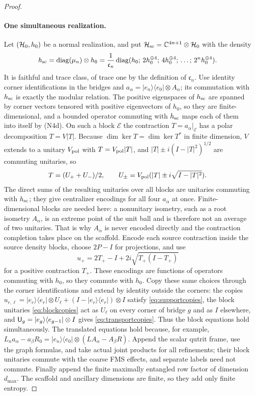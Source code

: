 \begin{proof}
\paragraph{One simultaneous realization.}
Let $(\mathcal H_0,h_0)$ be a normal realization, and put $\mathcal H_{\rm sc}=\mathbb C^{4n+1}\otimes\mathcal H_0$ with the density
\begin{equation}\label{eq:scaffold}
 h_{\rm sc}=\operatorname{diag}(\mu_n)\otimes h_0
 =\frac1{\mathfrak c_n}\operatorname{diag}
 (h_0;\,2h_0^{\oplus4};\,4h_0^{\oplus4};\,\ldots;\,2^nh_0^{\oplus4}).
\end{equation}
It is faithful and trace class, of trace one by the definition of $\mathfrak c_n$. Use identity corner identifications in the bridges and $a_\alpha=|e_n\rangle\langle e_0|\otimes A_\alpha$; its commutation with $h_{\rm sc}$ is exactly the modular relation. The positive eigenspaces of $h_{\rm sc}$ are spanned by corner vectors tensored with positive eigenvectors of $h_0$, so they are finite-dimensional, and a bounded operator commuting with $h_{\rm sc}$ maps each of them into itself by (N4d). On such a block $\mathcal E$ the contraction $T=a_\alpha|_{\mathcal E}$ has a polar decomposition $T=V|T|$. Because $\dim\ker T=\dim\ker T^*$ in finite dimension, $V$ extends to a unitary $V_{\rm pol}$ with $T=V_{\rm pol}|T|$, and $|T|\pm i(I-|T|^2)^{1/2}$ are commuting unitaries, so
\[
 T=(U_++U_-)/2,\qquad
 U_\pm=V_{\rm pol}(|T|\pm i\sqrt{I-|T|^2}).
\]
The direct sums of the resulting unitaries over all blocks are unitaries commuting with $h_{\rm sc}$; they give centralizer encodings for all four $a_\alpha$ at once. Finite-dimensional blocks are needed here: a nonunitary isometry, such as a root isometry $A_\alpha$, is an extreme point of the unit ball and is therefore not an average of two unitaries. That is why $A_\alpha$ is never encoded directly and the contraction completion takes place on the scaffold. Encode each source contraction inside the source density blocks, choose $2P-I$ for projections, and use
\[
 u_+=2T_+-I+2i\sqrt{T_+(I-T_+)}
\]
for a positive contraction $T_+$. These encodings are functions of operators commuting with $h_0$, so they commute with $h_0$. Copy these same choices through the corner identifications and extend by identity outside the corners: the copies $u_{r,\ell}=|e_r\rangle\langle e_r|\otimes U_\ell+(I-|e_r\rangle\langle e_r|)\otimes I$ satisfy \eqref{eq:supportcopies}, the block unitaries \eqref{eq:blockcopies} act as $U_\ell$ on every corner of bridge $g$ and as $I$ elsewhere, and ${\mathsf U}_g=|e_g\rangle\langle e_{g-1}|\otimes I$ gives \eqref{eq:transportcopies}. Thus the block equations hold simultaneously. The translated equations hold because, for example, $L_na_\alpha-a_\beta R_0=|e_n\rangle\langle e_0|\otimes(LA_\alpha-A_\beta R)$. Append the scalar qutrit frame, use the graph formulas, and take actual joint products for all refinements; their block unitaries commute with the coarse FMS effects, and separate labels need not commute. Finally append the finite maximally entangled row factor of dimension $d_{\max}$. The scaffold and ancillary dimensions are finite, so they add only finite entropy.


\end{proof}
